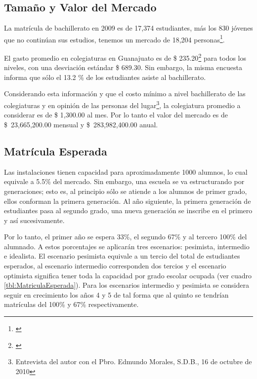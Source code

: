 \subsection{Tamaño y Valor del Mercado}

La matrícula de bachillerato en 2009 es de 17,374 estudiantes, más los 830 jóvenes que no continúan sus estudios, tenemos un mercado de 18,204 personas\footnote{\citep{Seg2010}}.

El gasto promedio en colegiaturas en Guanajuato es de \$ 235.20\footnote{\citep{INEGI-2009-DGES-003}} para todos los niveles, con una desviación estándar \$ 689.30. Sin embargo, la misma encuesta informa que sólo el 13.2 \% de los estudiantes asiste al bachillerato.

Considerando esta información y que el costo mínimo a nivel bachillerato de las colegiaturas y en opinión de las personas del lugar\footnote{Entrevista del autor con el Pbro. Edmundo Morales, S.D.B., 16 de octubre de 2010}, la colegiatura promedio a considerar es de \$ 1,300.00 al mes. Por lo tanto el valor del mercado es de \$~23,665,200.00 mensual y \$~283,982,400.00 anual.

\subsection{Matrícula Esperada}

Las instalaciones tienen capacidad para aproximadamente 1000 alumnos, lo cual equivale a 5.5\% del mercado. Sin embargo, una escuela se va estructurando por generaciones; esto es, al principio sólo se atiende a los alumnos de primer grado, ellos conforman la primera generación. Al año siguiente, la primera generación de estudiantes pasa al segundo grado, una nueva generación se inscribe en el primero y así sucesivamente.

Por lo tanto, el primer año se espera 33\%, el segundo 67\% y al tercero 100\% del alumnado. A estos porcentajes se aplicarán tres escenarios: pesimista, intermedio e idealista. El escenario pesimista equivale a un tercio del total de estudiantes esperados, al escenario intermedio corresponden dos tercios y el escenario optimista significa tener toda la capacidad por grado escolar ocupada (ver cuadro \ref{tbl:MatriculaEsperada}). Para los escenarios intermedio y pesimista se considera seguir en crecimiento los años 4 y 5 de tal forma que al quinto se tendrían matrículas del 100\% y 67\% respectivamente.







\clearpage
